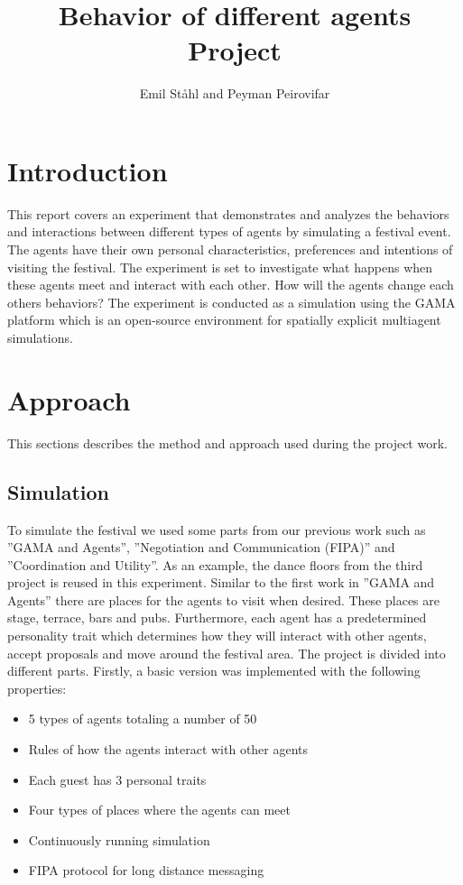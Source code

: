 \documentclass[a4paper,10pt]{article}
\title{\textbf{Behavior of different agents} \\ 
\textbf{Project}}
\author{Emil Ståhl and Peyman Peirovifar}
\begin{document}
\maketitle

\section{Introduction}
This report covers an experiment that demonstrates and analyzes the behaviors and interactions between different types of agents by simulating a festival event. The agents have their own personal characteristics, preferences and intentions of visiting the festival. The experiment is set to investigate what happens when these agents meet and interact with each other. How will the agents change each others behaviors?
The experiment is conducted as a simulation using the GAMA platform which is an open-source environment for spatially explicit multiagent simulations. 


\maketitle
\section{Approach}
This sections describes the method and approach used during the project work. 

\maketitle
\subsection{Simulation}
To simulate the festival we used some parts from our previous work such as ”GAMA and Agents”, ”Negotiation and Communication (FIPA)” and ”Coordination and Utility”. As an example, the dance floors from the third project is reused in this experiment. Similar to the first work in ”GAMA and Agents” there are places for the agents to visit when desired. These places are stage, terrace, bars and pubs. Furthermore, each agent has a predetermined personality trait which determines how they will interact with other agents, accept proposals and move around the festival area. 
The project is divided into different parts. Firstly, a basic version was implemented with the following properties:

\begin{itemize}
    \item 5 types of agents totaling a number of 50 
    \item Rules of how the agents interact with other agents
    \item Each guest has 3 personal traits
    \item Four types of places where the agents can meet
    \item Continuously running simulation
    \item FIPA protocol for long distance messaging
\end{itemize}
\end{document}
